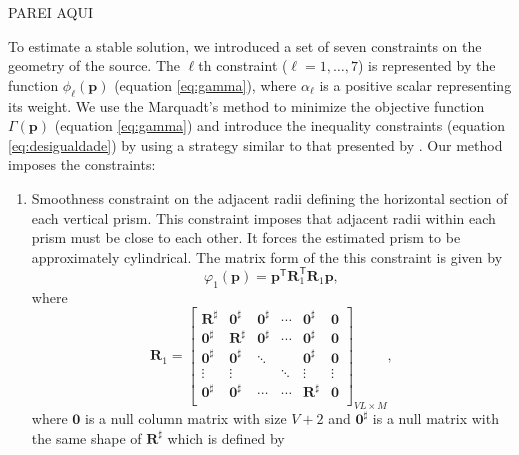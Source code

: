 PAREI AQUI

To estimate a stable solution, we introduced a set of seven constraints on the geometry of the source. The $\ell$th constraint ($\ell = 1, \dots , 7$) is represented by the function $\phi_{\ell} (\mathbf{p})$ (equation \ref{eq:gamma}), where $\alpha_{\ell}$ is a positive scalar representing its weight. We use the Marquadt's method to minimize the objective function $\Gamma (\mathbf{p})$ (equation \ref{eq:gamma}) and introduce the inequality constraints (equation \ref{eq:desigualdade}) by using a strategy similar to that presented by \citet{barbosa-etal1999}. Our method imposes the constraints:

\begin{enumerate}
\item Smoothness constraint on the adjacent radii defining the horizontal section of each vertical prism. This constraint imposes that adjacent radii within each prism must be close to each other. It forces the estimated prism to be approximately cylindrical. %
The matrix form of the this constraint is given by
\begin{equation}\label{eq:phi1m}
\varphi_{1}(\mathbf{p}) = \mathbf{p}^\mathsf{T}\mathbf{R}^\mathsf{T}_{1}\mathbf{R}_{1}\mathbf{p},
\end{equation}
where 
\begin{equation}
\mathbf{R}_{1} = 
\begin{bmatrix}
\mathbf{R}^{\sharp} & \mathbf{0}^{\sharp} & \mathbf{0}^{\sharp} & \cdots & \mathbf{0}^{\sharp} & \mathbf{0} \\
\mathbf{0}^{\sharp} & \textbf{R}^{\sharp} & \mathbf{0}^{\sharp} &  \cdots & \mathbf{0}^{\sharp} & \mathbf{0}\\
\mathbf{0}^{\sharp} & \mathbf{0}^{\sharp} & \ddots &  & \mathbf{0}^{\sharp} & \mathbf{0}\\
\vdots & \vdots &  & \ddots & \vdots & \vdots\\
\mathbf{0}^{\sharp} & \mathbf{0}^{\sharp} &  \cdots & \cdots & \mathbf{R}^{\sharp} & \mathbf{0}\\
\end{bmatrix}_{VL\times M},
\end{equation}
where $\mathbf{0}$ is a null column matrix with size $V+2$ and $\mathbf{0}^{\sharp}$ is a null matrix with the same shape of $\mathbf{R}^{\sharp}$ which is defined by 

\end{enumerate}
